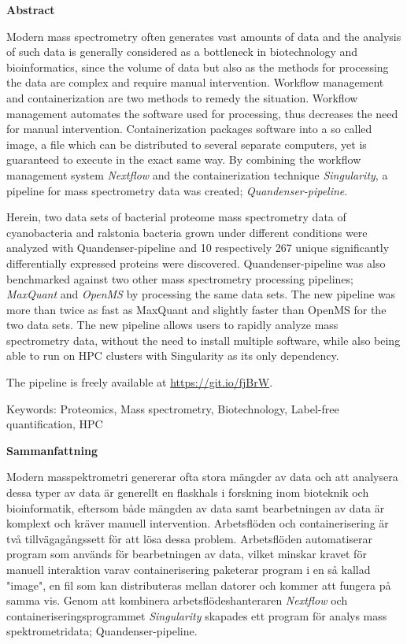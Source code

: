 \begin{center}\normalfont\Large\bfseries\centering Abstract\end{center}
Modern mass spectrometry often generates vast amounts of data and the analysis of such data is generally considered as a bottleneck in biotechnology and bioinformatics, since the volume of data but also as the methods for processing the data are complex and require manual intervention. Workflow management and containerization are two methods to remedy the situation. Workflow management automates the software used for processing, thus decreases the need for manual intervention. Containerization packages software into a so called image, a file which can be distributed to several separate computers, yet is guaranteed to execute in the exact same way. By combining the workflow management system \textit{Nextflow} and the containerization technique \textit{Singularity}, a pipeline for mass spectrometry data was created; \textit{Quandenser-pipeline}.

Herein, two data sets of bacterial proteome mass spectrometry data of cyanobacteria and ralstonia bacteria grown under different conditions were analyzed with Quandenser-pipeline and 10 respectively 267 unique significantly differentially expressed proteins were discovered. Quandenser-pipeline was also benchmarked against two other mass spectrometry processing pipelines; \textit{MaxQuant} and \textit{OpenMS} by processing the same data sets. The new pipeline was more than twice as fast as MaxQuant and slightly faster than OpenMS for the two data sets. The new pipeline allows users to rapidly analyze mass spectrometry data, without the need to install multiple software, while also being able to run on HPC clusters with Singularity as its only dependency.

The pipeline is freely available at \url{https://git.io/fjBrW}.

\vspace{2cm}

Keywords: Proteomics, Mass spectrometry, Biotechnology, Label-free quantification, HPC

\newpage

\begin{center}\normalfont\Large\bfseries\centering Sammanfattning\end{center}
Modern masspektrometri genererar ofta stora mängder av data och att analysera dessa typer av data är generellt en flaskhals i forskning inom bioteknik och bioinformatik, eftersom både mängden av data samt bearbetningen av data är komplext och kräver manuell intervention. Arbetsflöden och containerisering är två tillvägagångssett för att lösa dessa problem. Arbetsflöden automatiserar program som används för bearbetningen av data, vilket minskar kravet för manuell interaktion varav containerisering paketerar program i en så kallad "image", en fil som kan distributeras mellan datorer och kommer att fungera på samma vis. Genom att kombinera arbetsflödeshanteraren \textit{Nextflow} och containeriseringsprogrammet \textit{Singularity} skapades ett program för analys mass spektrometridata; Quandenser-pipeline.

